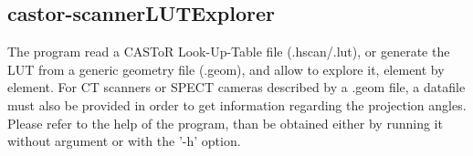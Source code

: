 \documentclass[a4paper, 11pt]{article}
\begin{document}
\subsection{castor-scannerLUTExplorer}
\label{ss_utilities_sexplorer}

The program read a CASToR Look-Up-Table file (.hscan/.lut), or generate the LUT from a generic geometry file (.geom), and allow to explore it, element by element. For CT scanners or SPECT cameras described by a .geom file, a datafile must also be provided in order to get information regarding the projection angles. Please refer to the help of the program, than be obtained either by running it without argument or with the '-h' option.


\newpage
 
% 


\end{document}
